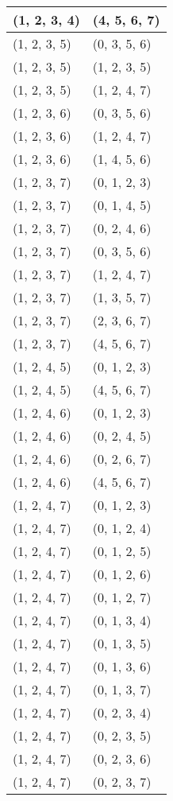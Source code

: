 \begin{footnotesize}
\begin{longtable}[c]{|l|l|}
(1, 2, 3, 4)
&(4, 5, 6, 7)
\\ \hline
(1, 2, 3, 5)
&(0, 3, 5, 6)
\\ \hline
(1, 2, 3, 5)
&(1, 2, 3, 5)
\\ \hline
(1, 2, 3, 5)
&(1, 2, 4, 7)
\\ \hline
(1, 2, 3, 6)
&(0, 3, 5, 6)
\\ \hline
(1, 2, 3, 6)
&(1, 2, 4, 7)
\\ \hline
(1, 2, 3, 6)
&(1, 4, 5, 6)
\\ \hline
(1, 2, 3, 7)
&(0, 1, 2, 3)
\\ \hline
(1, 2, 3, 7)
&(0, 1, 4, 5)
\\ \hline
(1, 2, 3, 7)
&(0, 2, 4, 6)
\\ \hline
(1, 2, 3, 7)
&(0, 3, 5, 6)
\\ \hline
(1, 2, 3, 7)
&(1, 2, 4, 7)
\\ \hline
(1, 2, 3, 7)
&(1, 3, 5, 7)
\\ \hline
(1, 2, 3, 7)
&(2, 3, 6, 7)
\\ \hline
(1, 2, 3, 7)
&(4, 5, 6, 7)
\\ \hline
(1, 2, 4, 5)
&(0, 1, 2, 3)
\\ \hline
(1, 2, 4, 5)
&(4, 5, 6, 7)
\\ \hline
(1, 2, 4, 6)
&(0, 1, 2, 3)
\\ \hline
(1, 2, 4, 6)
&(0, 2, 4, 5)
\\ \hline
(1, 2, 4, 6)
&(0, 2, 6, 7)
\\ \hline
(1, 2, 4, 6)
&(4, 5, 6, 7)
\\ \hline
(1, 2, 4, 7)
&(0, 1, 2, 3)
\\ \hline
(1, 2, 4, 7)
&(0, 1, 2, 4)
\\ \hline
(1, 2, 4, 7)
&(0, 1, 2, 5)
\\ \hline
(1, 2, 4, 7)
&(0, 1, 2, 6)
\\ \hline
(1, 2, 4, 7)
&(0, 1, 2, 7)
\\ \hline
(1, 2, 4, 7)
&(0, 1, 3, 4)
\\ \hline
(1, 2, 4, 7)
&(0, 1, 3, 5)
\\ \hline
(1, 2, 4, 7)
&(0, 1, 3, 6)
\\ \hline
(1, 2, 4, 7)
&(0, 1, 3, 7)
\\ \hline
(1, 2, 4, 7)
&(0, 2, 3, 4)
\\ \hline
(1, 2, 4, 7)
&(0, 2, 3, 5)
\\ \hline
(1, 2, 4, 7)
&(0, 2, 3, 6)
\\ \hline
(1, 2, 4, 7)
&(0, 2, 3, 7)
\\ \hline

\end{longtable}
\end{footnotesize}
